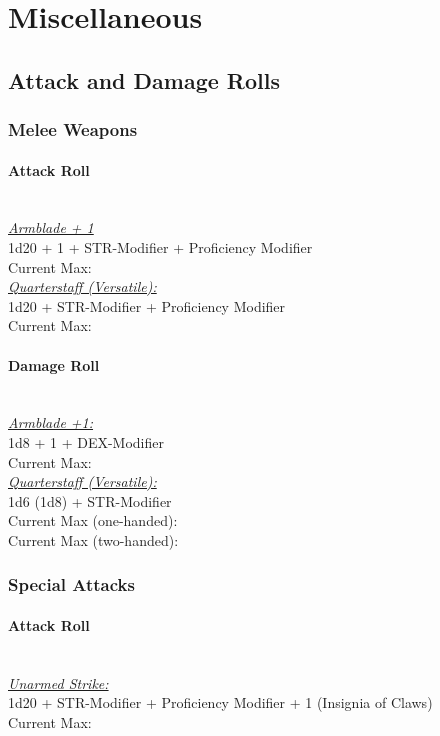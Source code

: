 \documentclass[letterpaper,openany,oneside,twocolumn]{book}
\begin{document}
\section*{Miscellaneous}
\subsection*{Attack and Damage Rolls}
\subsubsection*{Melee Weapons}
\paragraph*{Attack Roll}\hfill\\
\underline{\textit{Armblade + 1}}\\
1d20 + 1 + STR-Modifier + Proficiency Modifier\\
\indent Current Max: 
\\
\underline{\textit{Quarterstaff (Versatile):}}\\
1d20 + STR-Modifier + Proficiency Modifier\\
\indent Current Max: 
\paragraph*{Damage Roll}\hfill\\
\underline{\textit{Armblade +1:}}\\
1d8 + 1 + DEX-Modifier\\
\indent Current Max: 
\\
\underline{\textit{Quarterstaff (Versatile):}}\\
1d6 (1d8) + STR-Modifier\\
\indent Current Max (one-handed): \\
\indent Current Max (two-handed): 
\subsubsection*{Special Attacks}
\paragraph*{Attack Roll}\hfill\\
\underline{\textit{Unarmed Strike:}}\\
1d20 + STR-Modifier + Proficiency Modifier + 1 (Insignia of Claws)\\
\indent Current Max: 
\end{document}
